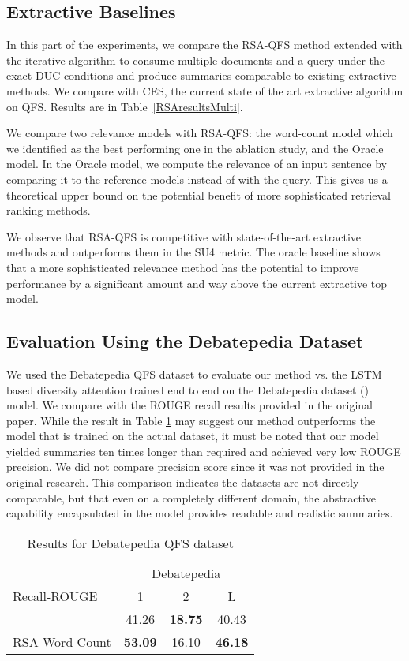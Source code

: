 \documentclass[11pt,a4paper]{article}
\begin{document}
\subsection{Extractive Baselines}

In this part of the experiments, we compare the RSA-QFS method extended with the iterative algorithm to consume multiple documents and a query under the exact DUC conditions and produce summaries comparable to existing extractive methods.  We compare with CES, the current state of the art extractive algorithm on QFS.  Results are in Table~\ref{RSAresultsMulti}.  

We compare two relevance models with RSA-QFS: the word-count model which we identified as the best performing one in the ablation study, and the Oracle model. In the Oracle model, we compute the relevance of an input sentence by comparing it to the reference models instead of with the query.  This gives us a theoretical upper bound on the potential benefit of more sophisticated retrieval ranking methods.

We observe that RSA-QFS is competitive with state-of-the-art extractive methods and outperforms them in the SU4 metric. The oracle baseline shows that a more sophisticated relevance method has the potential to improve performance by a significant amount and way above the current extractive top model.

\subsection{Evaluation Using the Debatepedia Dataset}
We used the Debatepedia QFS dataset \cite{nema2017diversity} to evaluate our method vs. the LSTM based diversity attention trained end to end on the Debatepedia dataset () model. We compare with the ROUGE recall results provided in the original paper. While the result in Table \ref{RSAdebatepedia} may suggest our method outperforms the model that is trained on the actual dataset, it must be noted that our model yielded summaries ten times longer than required and achieved very low ROUGE precision. We did not compare precision score since it was not provided in the original research.  This comparison indicates the datasets are not directly comparable, but that even on a completely different domain, the abstractive capability encapsulated in the model provides readable and realistic summaries.

\begin{table}
\centering
 \begin{small}
    \begin{tabular}{l|ccc}
    
    \toprule
    & \multicolumn{3}{c}{Debatepedia}\\ 
    Recall-ROUGE & 1 & 2 &  L \\
    \midrule
     & 41.26 & \textbf{18.75}  & 40.43 \\
    RSA Word Count  & \textbf{53.09} & 16.10 & \textbf{46.18} \\
    \bottomrule 
    \end{tabular}
  \end{small}
 \caption{Results for Debatepedia QFS dataset}
      \label{RSAdebatepedia}
\end{table}
\end{document}
